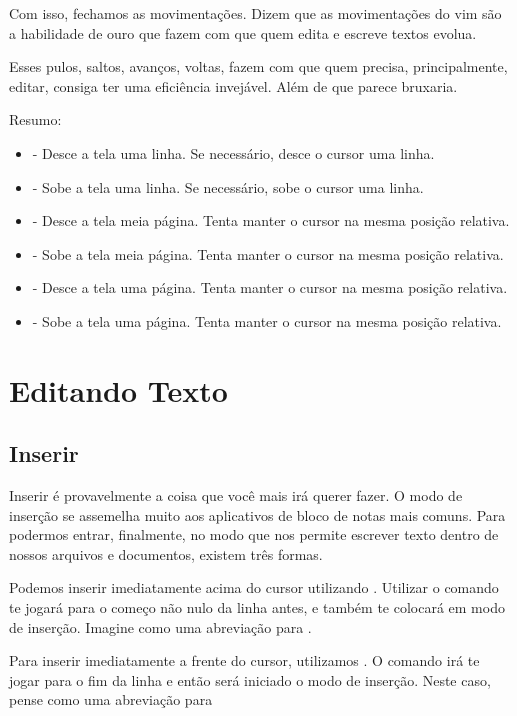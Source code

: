 Com isso, fechamos as movimentações.
Dizem que as movimentações do vim são a habilidade de ouro que fazem com que quem edita e escreve textos evolua.

Esses pulos, saltos, avanços, voltas, fazem com que quem precisa, principalmente, editar, consiga ter uma eficiência invejável.
Além de que parece bruxaria.

Resumo:
\begin{itemize}
    \item {} - Desce a tela uma linha. Se necessário, desce o cursor uma linha.
    \item {} - Sobe a tela uma linha. Se necessário, sobe o cursor uma linha.
    \item {} - Desce a tela meia página. Tenta manter o cursor na mesma posição relativa.
    \item {} - Sobe a tela meia página. Tenta manter o cursor na mesma posição relativa.
    \item {} - Desce a tela uma página. Tenta manter o cursor na mesma posição relativa.
    \item {} - Sobe a tela uma página. Tenta manter o cursor na mesma posição relativa.
\end{itemize}

\section{Editando Texto}

\subsection{Inserir}
Inserir é provavelmente a coisa que você mais irá querer fazer.
O modo de inserção se assemelha muito aos aplicativos de bloco de notas mais comuns.
Para podermos entrar, finalmente, no modo que nos permite escrever texto dentro de nossos
arquivos e documentos, existem três formas.

Podemos inserir imediatamente acima do cursor utilizando .
Utilizar o comando  te jogará para o começo não nulo da linha antes,
e também te colocará em modo de inserção.
Imagine como uma abreviação para \vimcommand{\^}.

Para inserir imediatamente a frente do cursor, utilizamos .
O comando  irá te jogar para o fim da linha e então será iniciado o modo de inserção.
Neste caso, pense como uma abreviação para 

